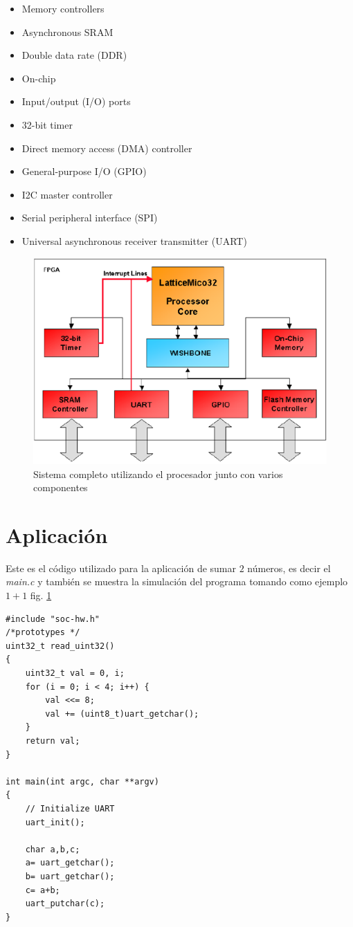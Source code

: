\documentclass[twocolumn]{IEEEtran}
\begin{document}
\begin{itemize}
 \item Memory controllers
 \item Asynchronous SRAM
 \item Double data rate (DDR)
 \item On-chip
 \item Input/output (I/O) ports
 \item 32-bit timer
 \item Direct memory access (DMA) controller
 \item General-purpose I/O (GPIO)
 \item I2C master controller
 \item Serial peripheral interface (SPI)
 \item Universal asynchronous receiver transmitter (UART)
\end{itemize}
\begin{figure}[H]
	\centering
		\includegraphics[scale=0.7]{fpga.png}
	\caption{Sistema completo utilizando el procesador junto con varios componentes}
	\label{fig4}
\end{figure}

\section{Aplicación}
\noindent
Este es el código utilizado para la aplicación de sumar $2$ números, es decir el \textit{main.c} y también se muestra la simulación del programa tomando como ejemplo $1+1$ fig. \ref{fig4}
\begin{verbatim}
#include "soc-hw.h"
/*prototypes */
uint32_t read_uint32()
{
	uint32_t val = 0, i;
    for (i = 0; i < 4; i++) {
        val <<= 8;
        val += (uint8_t)uart_getchar();
    }
    return val;
}

int main(int argc, char **argv)
{
	// Initialize UART
	uart_init();
	
	char a,b,c;
	a= uart_getchar();
	b= uart_getchar();
	c= a+b;
	uart_putchar(c);
}
\end{verbatim}
\end{document}
